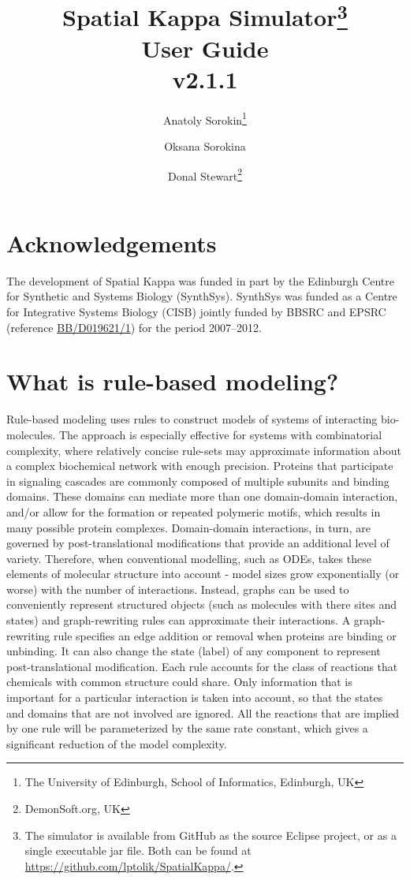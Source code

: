 \documentclass[english]{report}
\title{Spatial Kappa Simulator\thanks{The simulator is available from GitHub as the source Eclipse project, or as a single executable jar file. Both can be found at \url{https://github.com/lptolik/SpatialKappa/}. 
}\\User Guide\\v2.1.1}
\author{
Anatoly Sorokin\thanks{The University of Edinburgh, School of Informatics, Edinburgh, UK} 
\and Oksana Sorokina\footnotemark[2]
\and 
Donal Stewart\thanks{DemonSoft.org, UK}
}
\begin{document}
\maketitle


\section*{Acknowledgements}
The development of Spatial Kappa was funded in part by the Edinburgh Centre for Synthetic and Systems Biology (SynthSys). SynthSys was funded as a Centre for Integrative Systems Biology (CISB) jointly funded by BBSRC and EPSRC (reference \href{http://www.research.ed.ac.uk/portal/en/projects/centre-for-systems-biology-at-edinburgh-bbd0196211(66deffd6-c28b-44d7-adaf-9b574307c62b).html}{BB/D019621/1}) for the period 2007--2012.

\tableofcontents

%

\section*{What is rule-based modeling?}
Rule-based modeling uses rules to construct models of systems of interacting bio-molecules. The approach  is especially effective for systems with combinatorial complexity, where relatively concise rule-sets may approximate information about a complex biochemical network with enough precision. Proteins that participate in signaling cascades are commonly composed of multiple subunits and binding domains. These domains can mediate more than one domain-domain interaction, and/or allow for the formation or repeated polymeric motifs,
which results in many possible protein complexes. Domain-domain interactions, in turn, are governed by post-translational modifications that provide an additional level of variety. Therefore, when conventional modelling, such as ODEs, takes these elements of molecular structure into account - model sizes grow exponentially (or worse) with the number of interactions.
Instead, graphs can be used to conveniently represent structured objects (such as molecules with there sites and states) and graph-rewriting rules can approximate their interactions. 
A graph-rewriting rule specifies an edge addition or removal when proteins are binding or unbinding. It can also change the state (label) of any component to represent post-translational modification. Each rule accounts for the class of reactions that chemicals with common structure could share. Only information that is important for a particular interaction is taken into account, so that the states and domains that are not involved are ignored. All the reactions that are implied by one rule will be parameterized by the same rate constant, which gives a significant reduction of the model complexity.
\end{document}
